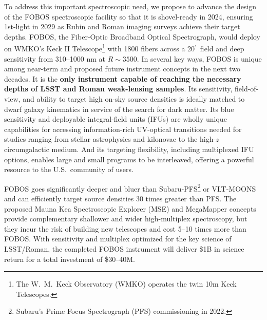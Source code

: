 \documentclass[oneside,11pt]{amsart}
\newcommand{\arcmin}{\mbox{$^{\prime}$}}
\DeclareRobustCommand{\gtrsim}{%
\mathrel{\hskip-.5em\begin{array}{c}>\\[-8pt]\sim\end{array}\hskip-.5em}}
\begin{document}

To address this important spectroscopic need, we propose to advance the design of the FOBOS spectroscopic facility so that it is shovel-ready in 2024, ensuring 1st-light in 2029 as Rubin and Roman imaging surveys achieve their target depths.  FOBOS, the Fiber-Optic Broadband Optical Spectrograph, would deploy on WMKO's Keck II Telescope\footnote{The W.~M.\ Keck Observatory (WMKO) operates the twin 10m Keck Telescopes.} with 1800 fibers across a 20\arcmin\ field and deep sensitivity from 310--1000 nm at $R \sim 3500$.  In several key ways, FOBOS is unique among near-term and proposed future instrument concepts in the next two decades\citep{bundy19}.  It is the \textbf{only instrument capable of reaching the necessary depths of LSST and Roman weak-lensing samples}.  Its sensitivity, field-of-view, and ability to target high on-sky source densities is ideally matched to dwarf galaxy kinematics in service of the search for dark matter.  Its blue sensitivity and deployable integral-field units (IFUs) are wholly unique capabilities for accessing information-rich UV-optical transitions needed for studies ranging from stellar astrophysics and kilonovae to the high-$z$ circumgalactic medium.  And its targeting flexibility, including multiplexed IFU options, enables large and small programs to be interleaved, offering a powerful resource to the U.S.\ community of users.

FOBOS goes significantly deeper and bluer than Subaru-PFS\footnote{Subaru's Prime Focus Spectrograph (PFS) commissioning in 2022.} or VLT-MOONS and can efficiently target source densities 30 times greater than PFS.  The proposed Mauna Kea Spectroscopic Explorer (MSE) and MegaMapper concepts provide complementary shallower and wider high-multiplex spectroscopy, but they incur the risk of building new telescopes and cost 5--10 times more than FOBOS.  With sensitivity and multiplex optimized for the key science of LSST/Roman, the completed FOBOS instrument will deliver \$1B in science return for a total investment of \$30--40M.




\end{document}
